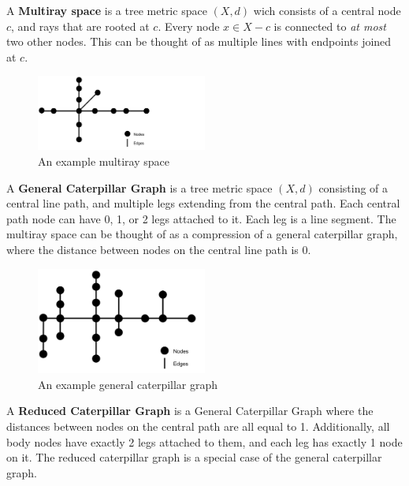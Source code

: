 \begin{definition}
    A \textbf{Multiray space} is a tree metric space $(X, d)$ wich consists of a central node $c$, and rays that are rooted at $c$. Every node $x \in X - c$ is connected to \textit{at most} two other nodes. This can be thought of as multiple lines with endpoints joined at $c$.
\end{definition}

\begin{figure}[H]
    \centering
    \includegraphics[width=0.5\textwidth]{images/multiray.png}
    \caption{An example multiray space}
\end{figure}

\begin{definition}
    A \textbf{General Caterpillar Graph} is a tree metric space $(X, d)$ consisting of a central line path, and multiple legs extending from the central path. Each central path node can have 0, 1, or 2 legs attached to it. Each leg is a line segment. The multiray space can be thought of as a compression of a general caterpillar graph, where the distance between nodes on the central line path is 0.
\end{definition}

\begin{figure}[H]
    \centering
    \includegraphics[width=0.5\textwidth]{images/generalCaterpillar.png}
    \caption{An example general caterpillar graph}
\end{figure}

\begin{definition}
    A \textbf{Reduced Caterpillar Graph} is a General Caterpillar Graph where the distances between nodes on the central path are all equal to 1. Additionally, all body nodes have exactly 2 legs attached to them, and each leg has exactly 1 node on it. The reduced caterpillar graph is a special case of the general caterpillar graph.
\end{definition}

